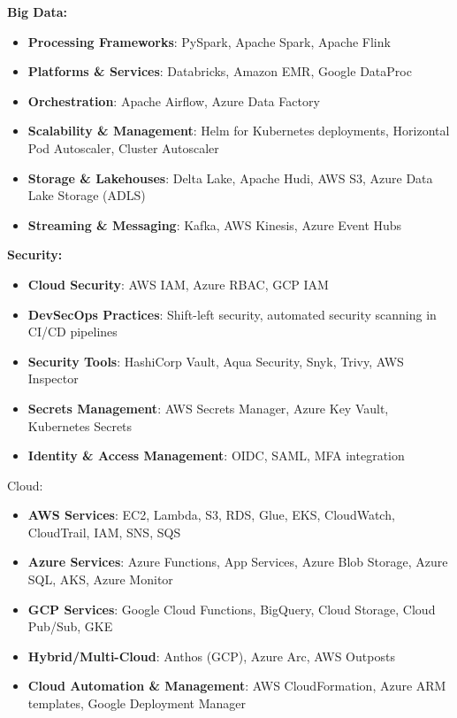 \documentclass[a4paper]{article}
\begin{document}
\textbf{Big Data:}

\begin{itemize}
\item
  \textbf{Processing Frameworks}: PySpark, Apache Spark, Apache Flink
\item
  \textbf{Platforms \& Services}: Databricks, Amazon EMR, Google
  DataProc
\item
  \textbf{Orchestration}: Apache Airflow, Azure Data Factory
\item
  \textbf{Scalability \& Management}: Helm for Kubernetes deployments,
  Horizontal Pod Autoscaler, Cluster Autoscaler
\item
  \textbf{Storage \& Lakehouses}: Delta Lake, Apache Hudi, AWS S3, Azure
  Data Lake Storage (ADLS)
\item
  \textbf{Streaming \& Messaging}: Kafka, AWS Kinesis, Azure Event Hubs
\end{itemize}

\textbf{Security:}

\begin{itemize}
\item
  \textbf{Cloud Security}: AWS IAM, Azure RBAC, GCP IAM
\item
  \textbf{DevSecOps Practices}: Shift-left security, automated security
  scanning in CI/CD pipelines
\item
  \textbf{Security Tools}: HashiCorp Vault, Aqua Security, Snyk, Trivy,
  AWS Inspector
\item
  \textbf{Secrets Management}: AWS Secrets Manager, Azure Key Vault,
  Kubernetes Secrets
\item
  \textbf{Identity \& Access Management}: OIDC, SAML, MFA integration
\end{itemize}

Cloud:

\begin{itemize}
\item
  \textbf{AWS Services}: EC2, Lambda, S3, RDS, Glue, EKS, CloudWatch,
  CloudTrail, IAM, SNS, SQS
\item
  \textbf{Azure Services}: Azure Functions, App Services, Azure Blob
  Storage, Azure SQL, AKS, Azure Monitor
\item
  \textbf{GCP Services}: Google Cloud Functions, BigQuery, Cloud
  Storage, Cloud Pub/Sub, GKE
\item
  \textbf{Hybrid/Multi-Cloud}: Anthos (GCP), Azure Arc, AWS Outposts
\item
  \textbf{Cloud Automation \& Management}: AWS CloudFormation, Azure ARM
  templates, Google Deployment Manager
\end{itemize}
\end{document}
